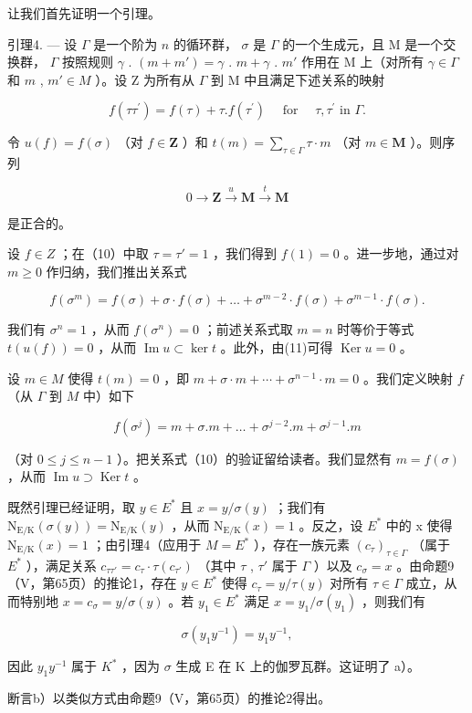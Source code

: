 让我们首先证明一个引理。

引理4. --- 设 \(\Gamma\) 是一个阶为 \(n\) 的循环群， \(\sigma\) 是 \(\Gamma\) 的一个生成元，且 M 是一个交换群， \(\Gamma\) 按照规则 \(\gamma\) . \((m + m') = \gamma\) . \(m + \gamma\) . \(m'\) 作用在 M 上（对所有 \(\gamma \in \Gamma\) 和 \(m\) , \(m' \in M\) ）。设 Z 为所有从 \(\Gamma\) 到 M 中且满足下述关系的映射

\[
f \left(\tau \tau^ {\prime}\right) = f (\tau) + \tau . f \left(\tau^ {\prime}\right) \quad \text { for } \quad \tau , \tau^ {\prime} \text { in } \Gamma .\tag{10}
\]

令 \(u(f) = f(\sigma)\) （对 \(f \in \mathbf{Z}\) ）和 \(t(m) = \sum_{\tau \in \Gamma} \tau \cdot m\) （对 \(m \in \mathbf{M}\) ）。则序列

\[
0 \to \mathbf {Z} \xrightarrow {u} \mathbf {M} \xrightarrow {t} \mathbf {M}
\]

是正合的。

设 \(f \in Z\) ；在（10）中取 \(\tau = \tau' = 1\) ，我们得到 \(f(1) = 0\) 。进一步地，通过对 \(m \geqslant 0\) 作归纳，我们推出关系式

\[
f (\sigma^ {m}) = f (\sigma) + \sigma \cdot f (\sigma) + \dots + \sigma^ {m - 2} \cdot f (\sigma) + \sigma^ {m - 1} \cdot f (\sigma).\tag{11}
\]

我们有 \(\sigma^n = 1\) ，从而 \(f(\sigma^n) = 0\) ；前述关系式取 \(m = n\) 时等价于等式 \(t(u(f)) = 0\) ，从而 \(\operatorname{Im} u \subset \ker t\) 。此外，由(11)可得 \(\operatorname{Ker} u = 0\) 。

设 \(m \in M\) 使得 \(t(m) = 0\) ，即 \(m + \sigma \cdot m + \cdots + \sigma^{n-1} \cdot m = 0\) 。我们定义映射 \(f\) （从 \(\Gamma\) 到 \(M\) 中）如下

\[
f \left(\sigma^ {j}\right) = m + \sigma . m + \dots + \sigma^ {j - 2}. m + \sigma^ {j - 1}. m\tag{12}
\]

（对 \(0 \leqslant j \leqslant n - 1\) ）。把关系式（10）的验证留给读者。我们显然有 \(m = f(\sigma)\) ，从而 \(\operatorname{Im} u \supset \operatorname{Ker} t\) 。

既然引理已经证明，取 \(y \in E^{*}\) 且 \(x = y / \sigma(y)\) ；我们有 \(\mathrm{N}_{\mathrm{E}/\mathrm{K}}(\sigma(y)) = \mathrm{N}_{\mathrm{E}/\mathrm{K}}(y)\) ，从而 \(\mathrm{N}_{\mathrm{E}/\mathrm{K}}(x) = 1\) 。反之，设 \(E^{*}\) 中的 x 使得 \(\mathrm{N}_{\mathrm{E}/\mathrm{K}}(x) = 1\) ；由引理4（应用于 \(M = E^{*}\) ），存在一族元素 \((c_{\tau})_{\tau \in \Gamma}\) （属于 \(E^{*}\) ），满足关系 \(c_{\tau\tau'} = c_{\tau} \cdot \tau(c_{\tau'})\) （其中 \(\tau\) , \(\tau'\) 属于 \(\Gamma\) ）以及 \(c_{\sigma} = x\) 。由命题9（V，第65页）的推论1，存在 \(y \in E^{*}\) 使得 \(c_{\tau} = y / \tau(y)\) 对所有 \(\tau \in \Gamma\) 成立，从而特别地 \(x = c_{\sigma} = y / \sigma(y)\) 。若 \(y_{1} \in E^{*}\) 满足 \(x = y_{1} / \sigma(y_{1})\) ，则我们有

\[
\sigma \left(y _ {1} y ^ {- 1}\right) = y _ {1} y ^ {- 1},
\]

因此 \(y_{1}y^{-1}\) 属于 \(K^{*}\) ，因为 \(\sigma\) 生成 E 在 K 上的伽罗瓦群。这证明了 a）。

断言b）以类似方式由命题9（V，第65页）的推论2得出。


